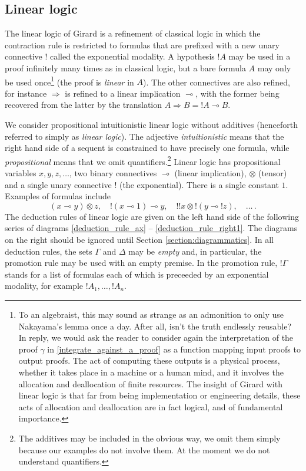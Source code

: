 \documentclass[english,letter paper,12pt,reqno]{article}
\theoremstyle{example}
\numberwithin{equation}{section}
\begin{document}
\subsection{Linear logic}

The linear logic of Girard \cite{girard_llogic, mellies} is a refinement of classical logic in which the contraction rule is restricted to formulas that are prefixed with a new unary connective ${!}$ called the exponential modality. A hypothesis ${!} A$ may be used in a proof infinitely many times as in classical logic, but a bare formula $A$ may only be used once\footnote{To an algebraist, this may sound as strange as an admonition to only use Nakayama's lemma once a day. After all, isn't the truth endlessly reusable? In reply, we would ask the reader to consider again the interpretation of the proof $\gamma$ in \eqref{integrate_against_a_proof} as a function mapping input proofs to output proofs. The act of computing these outputs is a physical process, whether it takes place in a machine or a human mind, and it involves the allocation and deallocation of finite resources. The insight of Girard with linear logic is that far from being implementation or engineering details, these acts of allocation and deallocation are in fact logical, and of fundamental importance.} (the proof is \emph{linear} in $A$). The other connectives are also refined, for instance $\Rightarrow$ is refined to a linear implication $\multimap$, with the former being recovered from the latter by the translation $A \Rightarrow B = {!} A \multimap B$.

We consider propositional intuitionistic linear logic without additives (henceforth referred to simply as \emph{linear logic}). The adjective \emph{intuitionistic} means that the right hand side of a sequent is constrained to have precisely one formula, while \emph{propositional} means that we omit quantifiers.\footnote{The additives may be included in the obvious way, we omit them simply because our examples do not involve them. At the moment we do not understand quantifiers.} Linear logic has propositional variables $x,y,z,\ldots$, two binary connectives $\multimap$ (linear implication), $\otimes$ (tensor) and a single unary connective $!$ (the exponential). There is a single constant $1$. Examples of formulas include
\[
(x \multimap y) \otimes z, \quad {!}( x \multimap 1 ) \multimap y, \quad {!}{!}x \otimes {!}( y \multimap {!}z ), \quad \ldots\,.
\]
The deduction rules of linear logic are given on the left hand side of the following series of diagrams \eqref{deduction_rule_ax} -- \eqref{deduction_rule_right1}. The diagrams on the right should be ignored until Section \ref{section:diagrammatics}. In all deduction rules, the sets $\Gamma$ and $\Delta$ may be \emph{empty} and, in particular, the promotion rule may be used with an empty premise. In the promotion rule, ${!} \Gamma$ stands for a list of formulas each of which is preceeded by an exponential modality, for example ${!}A_1,\ldots, {!}A_n$.
\end{document}
